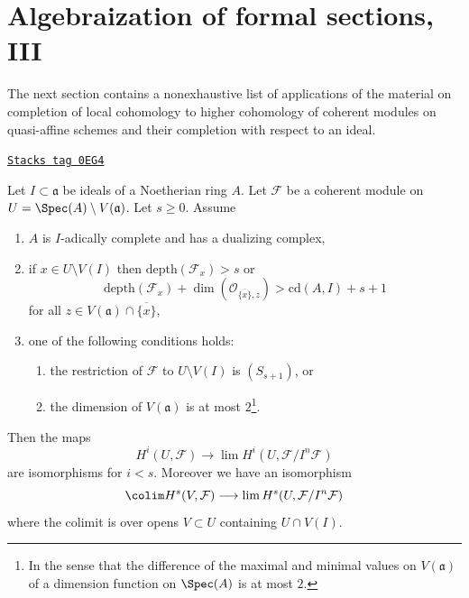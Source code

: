 \section{Algebraization of formal sections, III}
\label{algebraization-section-algebraization-sections-coherent-III}
The next section contains a nonexhaustive list of
applications of the material
on completion of local cohomology to higher cohomology
of coherent modules on quasi-affine schemes and their
completion with respect to an ideal.

\begin{proposition}
\label{algebraization-proposition-application-higher}
\href{https://stacks.math.columbia.edu/tag/0EG4}{\texttt{Stacks tag 0EG4}}

Let $I \subset \mathfrak a$ be ideals of a Noetherian ring $A$.
Let $\mathcal{F}$ be a coherent module on
$U = \Spec(A) \setminus V(\mathfrak a)$.
Let $s \geq 0$.
Assume
\begin{enumerate}
\item $A$ is $I$-adically complete and has a dualizing complex,
\item if $x \in U \setminus V(I)$ then
$\text{depth}(\mathcal{F}_x) > s$ or
$$
\text{depth}(\mathcal{F}_x) +
\dim(\mathcal{O}_{\overline{\{x\}}, z}) > \text{cd}(A, I) + s + 1
$$
for all $z \in V(\mathfrak a) \cap \overline{\{x\}}$,
\item one of the following conditions holds:
\begin{enumerate}
\item the restriction of $\mathcal{F}$ to $U \setminus V(I)$
is $(S_{s + 1})$, or
\item the dimension of $V(\mathfrak a)$ is at most $2$\footnote{In
the sense that the difference of the maximal and minimal values
on $V(\mathfrak a)$ of a dimension function on $\Spec(A)$ is at most $2$.}.
\end{enumerate}
\end{enumerate}
Then the maps
$$
H^i(U, \mathcal{F})
\longrightarrow
\lim H^i(U, \mathcal{F}/I^n\mathcal{F})
$$
are isomorphisms for $i < s$. Moreover we have an isomorphism
$$
\colim H^s(V, \mathcal{F})
\longrightarrow
\lim H^s(U, \mathcal{F}/I^n\mathcal{F})
$$
where the colimit is over opens $V \subset U$ containing $U \cap V(I)$.
\end{proposition}

